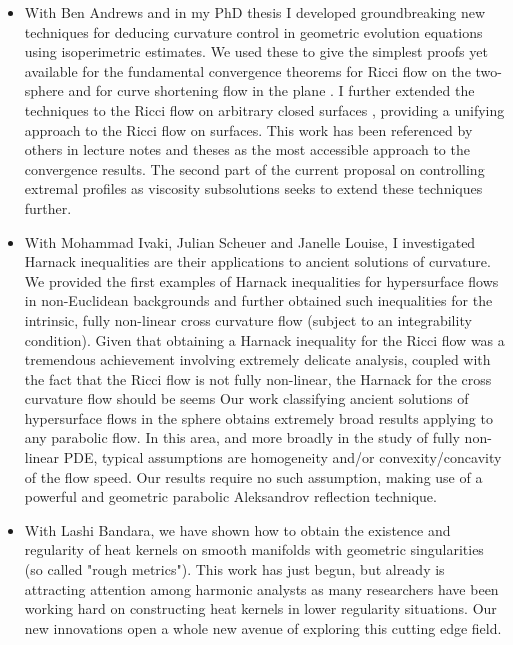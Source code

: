 \documentclass[12pt]{article}
\begin{document}
\begin{itemize}
\item With Ben Andrews and in my PhD thesis I developed groundbreaking new techniques for deducing curvature control in geometric evolution equations using isoperimetric estimates. We used these to give the simplest proofs yet available for the fundamental convergence theorems for Ricci flow on the two-sphere \cite{} and for curve shortening flow in the plane \cite{}. I further extended the techniques to the Ricci flow on arbitrary closed surfaces \cite{}, providing a unifying approach to the Ricci flow on surfaces. This work has been referenced by others in lecture notes and theses as the most accessible approach to the convergence results. The second part of the current proposal on controlling extremal profiles as viscosity subsolutions seeks to extend these techniques further.

\item With Mohammad Ivaki, Julian Scheuer and Janelle Louise, I investigated Harnack inequalities are their applications to ancient solutions of curvature. We provided the first examples of Harnack inequalities for hypersurface flows in non-Euclidean backgrounds and further obtained such inequalities for the intrinsic, fully non-linear cross curvature flow (subject to an integrability condition). Given that obtaining a Harnack inequality for the Ricci flow was a tremendous achievement involving extremely delicate analysis, coupled with the fact that the Ricci flow is not fully non-linear, the Harnack for the cross curvature flow should be seems Our work classifying ancient solutions of hypersurface flows in the sphere obtains extremely broad results applying to any parabolic flow. In this area, and more broadly in the study of fully non-linear PDE, typical assumptions are homogeneity and/or convexity/concavity of the flow speed. Our results require no such assumption, making use of a powerful and geometric parabolic Aleksandrov reflection technique.

\item With Lashi Bandara, we have shown how to obtain the existence and regularity of heat kernels on smooth manifolds with geometric singularities (so called "rough metrics"). This work has just begun, but already is attracting attention among harmonic analysts as many researchers have been working hard on constructing heat kernels in lower regularity situations. Our new innovations open a whole new avenue of exploring this cutting edge field.
\end{itemize}
\end{document}
